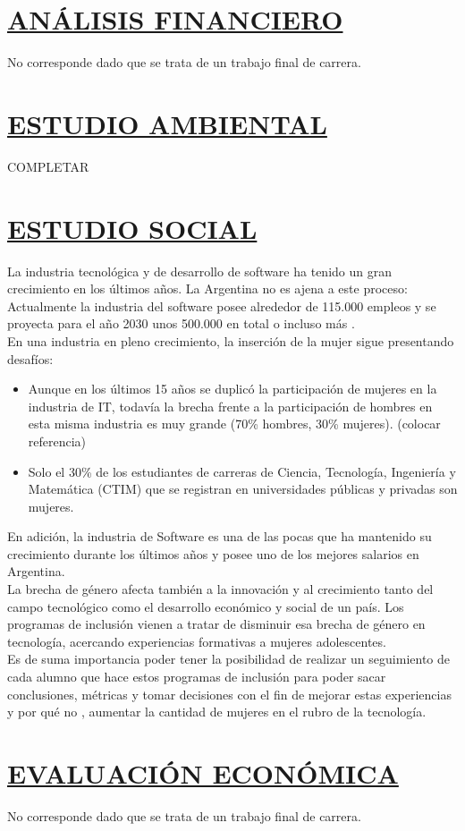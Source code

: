 \section*{\underline{ANÁLISIS FINANCIERO}}
No corresponde dado que se trata de un trabajo final de carrera.

\section*{\underline{ESTUDIO AMBIENTAL}}
COMPLETAR

\section*{\underline{ESTUDIO SOCIAL}}
La industria tecnológica y de desarrollo de software ha tenido un gran crecimiento en los últimos años. La Argentina no es ajena a este proceso: Actualmente la industria del software posee alrededor de 115.000 empleos y se proyecta para el año 2030 unos 500.000 en total o incluso más \textbf{\cite{EmpleosUltAnios}}.\\

En una industria en pleno crecimiento, la inserción de la mujer sigue presentando desafíos:
\begin{itemize}
	\item Aunque en los últimos 15 años se duplicó la participación de mujeres en la industria de IT, todavía la brecha frente a la participación de hombres en esta misma industria es muy grande (70\% hombres, 30\% mujeres). (colocar referencia)
	\item Solo el 30\% de los estudiantes de carreras de Ciencia, Tecnología, Ingeniería y Matemática (CTIM) que se registran en universidades públicas y privadas son mujeres. \textbf{\cite{MujeresCtim}}\\
\end{itemize}

En adición, la industria de Software es una de las pocas que ha mantenido su crecimiento durante los últimos años y posee uno de los mejores salarios en Argentina.\\

La brecha de género afecta también a la innovación y al crecimiento tanto del campo tecnológico como el desarrollo económico y social de un país. Los programas de inclusión vienen a tratar de disminuir esa brecha de género en tecnología, acercando experiencias formativas a mujeres adolescentes.\\

Es de suma importancia poder tener la posibilidad de realizar un seguimiento de cada alumno que hace estos programas de inclusión para poder sacar conclusiones, métricas y tomar decisiones con el fin de mejorar estas experiencias y por qué no , aumentar la cantidad de mujeres en el rubro de la tecnología. \\

\section*{\underline{EVALUACIÓN ECONÓMICA}}
No corresponde dado que se trata de un trabajo final de carrera.
